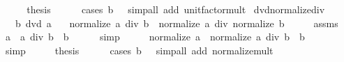 \begin{isabellebody}
\ \ \isamarkupfalse%
\ \isamarkupfalse%
\ {\isacharquery}{\kern0pt}thesis\isanewline
\ \ \ \ \isamarkupfalse%
\ {\isacharparenleft}{\kern0pt}cases\ {\isachardoublequoteopen}b\ {\isacharequal}{\kern0pt}\ {}{\isachardoublequoteclose}{\isacharparenright}{\kern0pt}\ {\isacharparenleft}{\kern0pt}simp{\isacharunderscore}{\kern0pt}all\ add{\isacharcolon}{\kern0pt}\ unit{\isacharunderscore}{\kern0pt}factor{\isacharunderscore}{\kern0pt}mult{\isacharparenright}{\kern0pt}\isanewline
{}\isamarkupfalse%
%
\endisatagproof
{\isafoldproof}%
%
\isadelimproof
\isanewline
%
\endisadelimproof
\isanewline
{}\isamarkupfalse%
\ dvd{\isacharunderscore}{\kern0pt}normalize{\isacharunderscore}{\kern0pt}div{\isacharcolon}{\kern0pt}\isanewline
\ \ \ {\isachardoublequoteopen}b\ dvd\ a{\isachardoublequoteclose}\isanewline
\ \ \ {\isachardoublequoteopen}normalize\ {\isacharparenleft}{\kern0pt}a\ div\ b{\isacharparenright}{\kern0pt}\ {\isacharequal}{\kern0pt}\ normalize\ a\ div\ normalize\ b{\isachardoublequoteclose}\isanewline
%
\isadelimproof
%
\endisadelimproof
%
\isatagproof
{}\isamarkupfalse%
\ {\isacharminus}{\kern0pt}\isanewline
\ \ \isamarkupfalse%
\ assms\ \isamarkupfalse%
\ {\isachardoublequoteopen}a\ {\isacharequal}{\kern0pt}\ a\ div\ b\ {\isacharasterisk}{\kern0pt}\ b{\isachardoublequoteclose}\isanewline
\ \ \ \ \isamarkupfalse%
\ simp\isanewline
\ \ \isamarkupfalse%
\ \isamarkupfalse%
\ {\isachardoublequoteopen}normalize\ a\ {\isacharequal}{\kern0pt}\ normalize\ {\isacharparenleft}{\kern0pt}a\ div\ b\ {\isacharasterisk}{\kern0pt}\ b{\isacharparenright}{\kern0pt}{\isachardoublequoteclose}\isanewline
\ \ \ \ \isamarkupfalse%
\ simp\isanewline
\ \ \isamarkupfalse%
\ \isamarkupfalse%
\ {\isacharquery}{\kern0pt}thesis\isanewline
\ \ \ \ \isamarkupfalse%
\ {\isacharparenleft}{\kern0pt}cases\ {\isachardoublequoteopen}b\ {\isacharequal}{\kern0pt}\ {}{\isachardoublequoteclose}{\isacharparenright}{\kern0pt}\ {\isacharparenleft}{\kern0pt}simp{\isacharunderscore}{\kern0pt}all\ add{\isacharcolon}{\kern0pt}\ normalize{\isacharunderscore}{\kern0pt}mult{\isacharparenright}{\kern0pt}\isanewline
{}\isamarkupfalse%
%
\endisatagproof
{\isafoldproof}%
%
\isadelimproof
\isanewline
%
\endisadelimproof
\isanewline
{}\isamarkupfalse%
%
\begin{isamarkuptext}%

\end{isamarkuptext}
\end{isabellebody}
